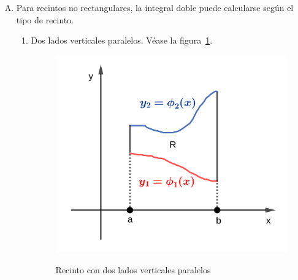 \documentclass{article}
\renewcommand{\Bbb}{\mathbb}
\begin{document}
\begin{enumerate}[(A)]
\begin{equation}
\tcboxmath[colback=orange!25!white,colframe=orange, title=Teorema de Fubbini]
{
\begin{array}{ll}
\iint_R f(x,y) \mathop{dx} \mathop{dy} = \int_a^b \left( \int_c^d f(x,y) \mathop{dy} \right) \mathop{dx} \\
\iint_R f(x,y) \mathop{dx} \mathop{dy} = \int_c^d \left( \int_a^b f(x,y) \mathop{dx} \right) \mathop{dy}
\end{array}
}
\end{equation}

Lo que este teorema dice es que dadas sus condiciones, la integral doble puede resolverse integrando primero respecto a $x$ y luego $y$, o viceversa. El resultado debería ser el mismo.

¿Qué se entiende por \textbf{conjunto de contenido nulo}? En $\Bbb R^2$, es un recinto de área nula. En $\Bbb R$, un segmento de longitud nula. En $\Bbb R^3$, volumen nulo. Para mayores dimensiones, será un concepto extendido de tamaño de un recinto.

\item Para recintos no rectangulares, la integral doble puede calcularse según el tipo de recinto.

\begin{enumerate}
\item Dos lados verticales paralelos. Véase la figura~\ref{fig:d1}.

\begin{figure}[ht]
\centering
\caption{Recinto con dos lados verticales paralelos}
\includegraphics[scale=0.75]{img/teo_fig025_d1.png}
\label{fig:d1}
\end{figure}


\end{enumerate}
\end{enumerate}
\end{document}
